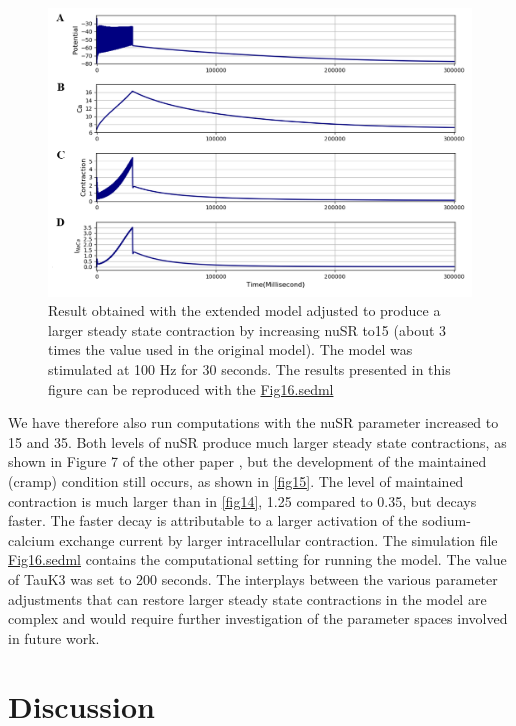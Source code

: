 \documentclass[fleqn,10pt]{physiome}
\begin{document}
\begin{figure}[h!]
\centering
\includegraphics[width=0.9\linewidth]{figure15}
\caption{Result obtained with the extended model adjusted to produce a larger steady state contraction by increasing nuSR to15 (about 3 times the value used in the original model). The model was stimulated at 100 Hz for 30 seconds. The results presented in this figure can be reproduced with the \href{https://models.physiomeproject.org/workspace/5f4/file/26289d9227fbf4f66ca8106d8bf80ff9a51a5ac6/Fig16.sedml}{Fig16.sedml}}
\label{fig15}
\end{figure}


\newpage
We have therefore also run computations with the nuSR parameter increased to 15 and 35. Both levels of nuSR produce much larger steady state contractions, as shown in Figure 7 of the other paper \citep{Noble2019Incorporation}, but the development of the maintained (cramp) condition still occurs, as shown in \autoref{fig15}. The level of maintained contraction is much larger than in \autoref{fig14}, 1.25 compared to 0.35, but decays faster. The faster decay is attributable to a larger activation of the sodium-calcium exchange current by larger intracellular contraction. The simulation file \href{http://models.cellml.org/workspace/5f4/file/099d70c2ee6ed5dfb1ca33e0ce16db4f0247a4dc/Fig16.sedml}{Fig16.sedml} contains the computational setting for running the model. The value of TauK3 was set to 200 seconds. The interplays between the various parameter adjustments that can restore larger steady state contractions in the model are complex and would require further investigation of the parameter spaces involved in future work.

\section{Discussion}
\end{document}
